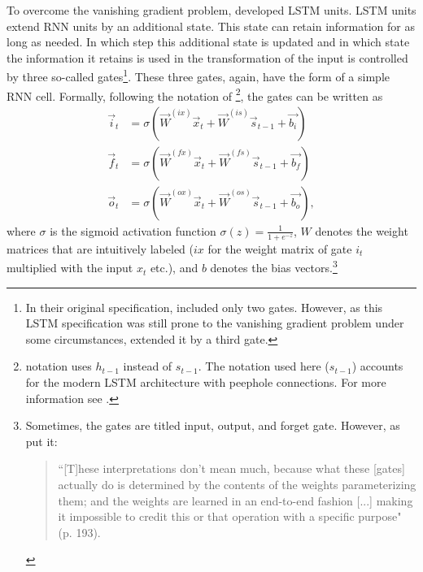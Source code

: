 To overcome the vanishing gradient problem, \citet{Hochreiter:1997} developed LSTM units. LSTM units extend RNN units by an additional state. This state can retain information for as long as needed. In which step this additional state is updated and in which state the information it retains is used in the transformation of the input is controlled by three so-called gates\footnote{In their original specification, \citet{Hochreiter:1997} included only two gates. However, as this LSTM specification was still prone to the vanishing gradient problem under some circumstances, \citet{Gers:2000} extended it by a third gate.}. These three gates, again, have the form of a simple RNN cell. Formally, following the notation of \citet{Lipton:2015}\footnote{\cites{Lipton:2015} notation uses $h_{t-1}$ instead of $s_{t-1}$. The notation used here ($s_{t-1}$) accounts for the modern LSTM architecture with peephole connections. For more information see \cite{Gers:2002}.}, the gates can be written as
%
\begin{equation} \label{Eq:LSTMgates}
\begin{split}
    \vec{i}_t&=\sigma\left(\vec{W}^{(ix)}\vec{x}_t+\vec{W}^{(is)}\vec{s}_{t-1}+\vec{b_i}\right)\\
    \vec{f}_t&=\sigma\left(\vec{W}^{(fx)}\vec{x}_t+\vec{W}^{(fs)}\vec{s}_{t-1}+\vec{b_f}\right)\\
    \vec{o}_t&=\sigma\left(\vec{W}^{(ox)}\vec{x}_t+\vec{W}^{(os)}\vec{s}_{t-1}+\vec{b_o}\right),
\end{split}   
\end{equation}
%
where $\sigma$ is the sigmoid activation function $\sigma(z)=\frac{1}{1+e^{-z}}$, $W$ denotes the weight matrices that are intuitively labeled ($ix$ for the weight matrix of gate $i_t$ multiplied with the input $x_t$ etc.), and $b$ denotes the bias vectors.\footnote{Sometimes, the gates are titled input, output, and forget gate. However, as \citet{Chollet:2018} put it:
\vspace{0.75\dimexpr-\topsep-\partopsep}
\begin{quote}
    ``[T]hese interpretations don’t mean much, because what these [gates] actually do is determined by the contents of the weights parameterizing them; and the weights are learned in an end-to-end fashion [...] making it impossible to credit this or that operation with a specific purpose" (p. 193).
\end{quote}\vspace{\dimexpr-\topsep-\partopsep}
}


